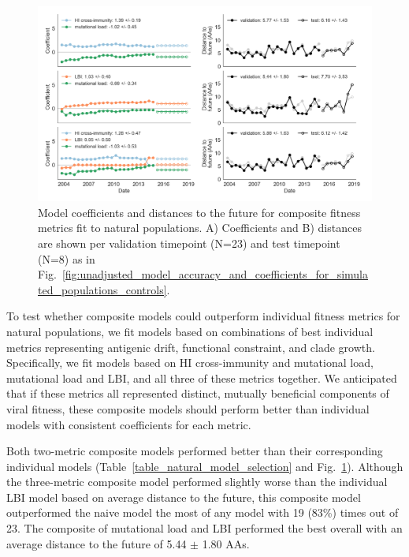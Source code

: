\begin{figure}[ht]
  \begin{center}
  \includegraphics[width=\textwidth]{figures/best-composite-unadjusted-model-accuracy-and-coefficients-for-natural-populations.png}
  \caption{
    Model coefficients and distances to the future for composite fitness metrics fit to natural populations.
    A) Coefficients and B) distances are shown per validation timepoint (N=23) and test timepoint (N=8) as in Fig.~\ref{fig:unadjusted_model_accuracy_and_coefficients_for_simulated_populations_controls}.
  }
  \label{fig:unadjusted_composite_model_accuracy_and_coefficients_for_natural_populations}
  \end{center}
\end{figure}

To test whether composite models could outperform individual fitness metrics for natural populations, we fit models based on combinations of best individual metrics representing antigenic drift, functional constraint, and clade growth.
Specifically, we fit models based on HI cross-immunity and mutational load, mutational load and LBI, and all three of these metrics together.
We anticipated that if these metrics all represented distinct, mutually beneficial components of viral fitness, these composite models should perform better than individual models with consistent coefficients for each metric.

Both two-metric composite models performed better than their corresponding individual models (Table~\ref{table_natural_model_selection} and Fig.~\ref{fig:unadjusted_composite_model_accuracy_and_coefficients_for_natural_populations}).
Although the three-metric composite model performed slightly worse than the individual LBI model based on average distance to the future, this composite model outperformed the naive model the most of any model with 19 (83\%) times out of 23.
The composite of mutational load and LBI performed the best overall with an average distance to the future of 5.44 $\pm$ 1.80 AAs.

